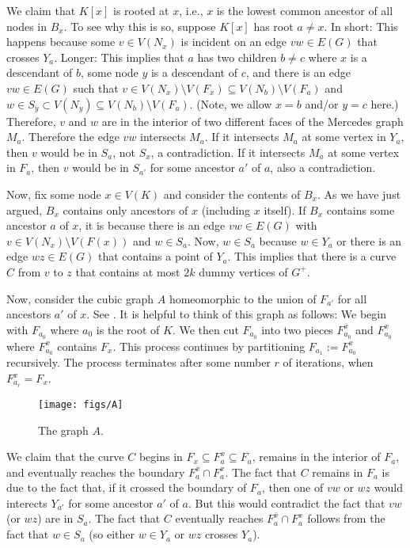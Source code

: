 \documentclass{patmorin}
\begin{document}
We claim that $K[x]$ is rooted at $x$, i.e., $x$ is the lowest common ancestor of all nodes in $B_x$.  To see why this is so, suppose $K[x]$ has root $a\neq x$.  In short: This happens because some $v\in V(N_x)$ is incident on an edge $vw\in E(G)$ that crosses $Y_a$.  Longer: This implies that $a$ has two children $b\neq c$ where $x$ is a descendant of $b$, some node $y$ is a descendant of $c$, and there is an edge $vw\in E(G)$ such that $v\in V(N_x)\setminus V(F_x)\subseteq V(N_b)\setminus V(F_a)$
and $w\in S_y\subset V(N_y)\subseteq V(N_b)\setminus V(F_a)$.  (Note, we allow $x=b$ and/or $y=c$ here.)  Therefore, $v$ and $w$ are in the interior of two different faces of the Mercedes graph $M_a$.  Therefore the edge $vw$ intersects $M_a$.  If it intersects $M_a$ at some vertex in $Y_a$, then $v$ would be in $S_a$, not $S_x$, a contradiction.  If it intersects $M_a$ at some vertex in $F_a$, then $v$ would be in $S_{a'}$ for some ancestor $a'$ of $a$, also a contradiction.

Now, fix some node $x\in V(K)$ and consider the contents of $B_x$.  As we have just argued, $B_x$ contains only ancestors of $x$ (including $x$ itself). If $B_x$ contains some ancestor $a$ of $x$, it is because there is an edge $vw\in E(G)$ with $v\in V(N_x)\setminus V(F(x))$ and $w\in S_a$.  Now, $w\in S_a$ because $w\in Y_a$ or there is an edge $wz\in E(G)$ that contains a point of $Y_a$.  This implies that there is a curve $C$ from $v$ to $z$ that contains at most $2k$ dummy  vertices of $G^+$.

Now, consider the cubic graph $A$ homeomorphic to the union of $F_{a'}$ for all ancestors $a'$ of $x$. See .  It is helpful to think of this graph as follows:  We begin with $F_{a_0}$ where $a_0$ is the root of $K$.  We then cut $F_{a_0}$ into two pieces $F^{\bar{x}}_{a_0}$ and $F^x_{a_0}$ where $F^x_{a_0}$ contains $F_x$.  This process continues by partitioning $F_{a_1}:=F^x_{a_0}$ recursively.  The process terminates after some number $r$ of iterations, when $F^x_{a_r}=F_x$.

\begin{figure}
  \begin{center}
    \texttt{[image: figs/A]}
  \end{center}
  \caption{The graph $A$.}
\end{figure}

We claim that the curve $C$ begins in $F_x\subseteq F^x_a\subseteq F_a$, remains in the interior of $F_a$, and eventually reaches the boundary $F^{\bar{x}}_a\cap F^x_a$.  The fact that $C$ remains in $F_a$ is due to the fact that, if it crossed the boundary of $F_a$, then one of $vw$ or $wz$ would interects $Y_{a'}$ for some ancestor $a'$ of $a$.  But this would contradict the fact that $vw$ (or $wz$) are in $S_a$. The fact that $C$ eventually reaches $F^{\bar{x}}_a\cap F^x_a$ follows from the fact that $w\in S_a$ (so either $w\in Y_a$ or $wz$ crosses $Y_a$).
\end{document}
